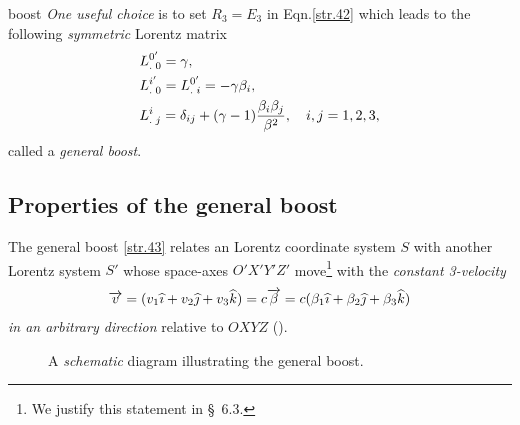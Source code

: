 \begin{small}
%
boost 
%
\textsl{One useful choice} is to set $R_3=E_3$ in 
Eqn.\eqref{str.42} which leads to the following 
\textsl{symmetric} Lorentz matrix
\begin{align}\label{str.43}
&{{L}^{0'}_{.\;0}}={\gamma},\notag \\& {{L}^{i'}_{.\;0}} 
={{L}^{0'}_{.\;i}} =
-{\gamma}{\beta}_i,\quad \notag \\
&{{L}^{i}_{.\;j}}=\delta_{ij}+ 
({\gamma}-1)\frac{{\beta}_i{\beta}_j}{{\beta}^2},\quad 
i,j=1,2,3,
\end{align}
called a \textsl{general boost}.

\subsection{Properties of the general boost} 
The general boost \eqref{str.43} relates an Lorentz 
coordinate system $S$ with another Lorentz system $S'$ 
whose 
space-axes $O'X'Y'Z'$ move\footnote{We justify this 
statement in \S~6.3.} with the \textsl{constant  
3-velocity} 
\begin{align*}
\overrightarrow{v} = (v_1{\widehat{\imath}}+v_2{\widehat{\jmath}} 
+v_3{\widehat{k}})= c \overrightarrow{{\beta}} = c({\beta}_1{\widehat{\imath}}+{\beta}_2{\widehat{\jmath}}+{\beta}_3 
{\widehat{k}})         
\end{align*} 
\textsl{in an arbitrary direction} relative to 
$OXYZ$ ().
\begin{figure}[H]
\begin{center}
\end{center}
\caption{A \textsl{schematic} diagram illustrating the 
general boost.}\label{fig4.3}
\end{figure}


\end{small}
